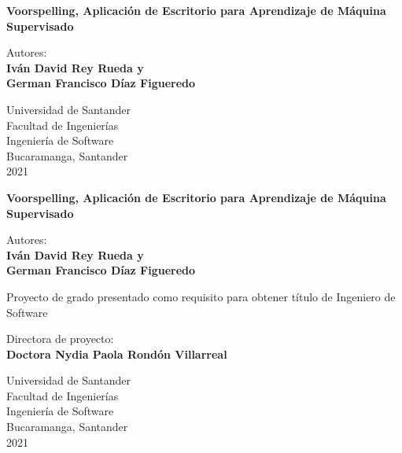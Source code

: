 
\begin{titlepage}
    \begin{center}
        \textbf{Voorspelling, Aplicación de Escritorio para Aprendizaje de Máquina Supervisado}
        \vfill
        
        Autores:\\
        \textbf{
        Iván David Rey Rueda y\\
        German Francisco Díaz Figueredo}
        
        \vfill
        
        Universidad de Santander\\
        Facultad de Ingenierías\\
        Ingeniería de Software\\
        Bucaramanga, Santander\\
        2021
    \end{center}
\thispagestyle{otherplain}   
\pagebreak
    
\begin{center}
        \textbf{Voorspelling, Aplicación de Escritorio para Aprendizaje de Máquina Supervisado}
        
        \vfill
        
        Autores:\\
        \textbf{
        Iván David Rey Rueda y\\
        German Francisco Díaz Figueredo}
        
        \vfill
        Proyecto de grado presentado como requisito para obtener título de Ingeniero de Software
        
        \vfill
        
        Directora de proyecto:\\
        \textbf{Doctora Nydia Paola Rondón Villarreal}
        
        \vfill
        
        Universidad de Santander\\
        Facultad de Ingenierías\\
        Ingeniería de Software\\
        Bucaramanga, Santander\\
        2021
        
    \end{center}
\thispagestyle{otherplain}   
\end{titlepage}